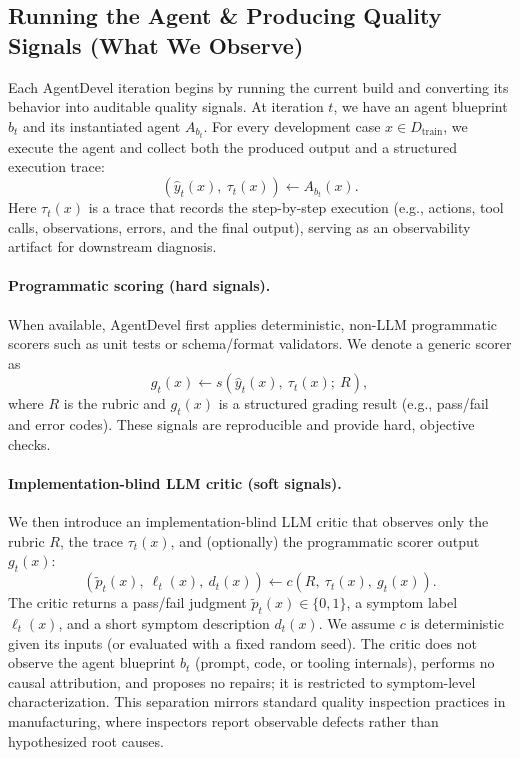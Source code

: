 \documentclass[11pt]{article}
\begin{document}
\subsection{Running the Agent \& Producing Quality Signals (What We Observe)}
\label{sec:running}

Each AgentDevel iteration begins by running the current build and converting its behavior into auditable quality signals. At iteration $t$, we have an agent blueprint $b_t$ and its instantiated agent $A_{b_t}$. For every development case $x \in D_{\text{train}}$, we execute the agent and collect both the produced output and a structured execution trace:
\begin{equation}
(\hat{y}_t(x),\ \tau_t(x)) \leftarrow A_{b_t}(x).
\end{equation}
Here $\tau_t(x)$ is a trace that records the step-by-step execution (e.g., actions, tool calls, observations, errors, and the final output), serving as an observability artifact for downstream diagnosis.

\paragraph{Programmatic scoring (hard signals).}
When available, AgentDevel first applies deterministic, non-LLM programmatic scorers such as unit tests or schema/format validators. We denote a generic scorer as
\begin{equation}
g_t(x) \leftarrow s\!\left(\hat{y}_t(x),\ \tau_t(x);\ R\right),
\end{equation}
where $R$ is the rubric and $g_t(x)$ is a structured grading result (e.g., pass/fail and error codes). These signals are reproducible and provide hard, objective checks.

\paragraph{Implementation-blind LLM critic (soft signals).}
We then introduce an implementation-blind LLM critic that observes only the rubric $R$, the trace $\tau_t(x)$, and (optionally) the programmatic scorer output $g_t(x)$:
\begin{equation}
(\tilde{p}_t(x),\ \ell_t(x),\ d_t(x)) \leftarrow c\!\left(R,\ \tau_t(x),\ g_t(x)\right).
\end{equation}
The critic returns a pass/fail judgment $\tilde{p}_t(x)\in\{0,1\}$, a symptom label $\ell_t(x)$, and a short symptom description $d_t(x)$. We assume $c$ is deterministic given its inputs (or evaluated with a fixed random seed). The critic does not observe the agent blueprint $b_t$ (prompt, code, or tooling internals), performs no causal attribution, and proposes no repairs; it is restricted to symptom-level characterization.  This separation mirrors standard quality inspection practices in manufacturing, where inspectors report observable defects rather than hypothesized root causes.
\end{document}
